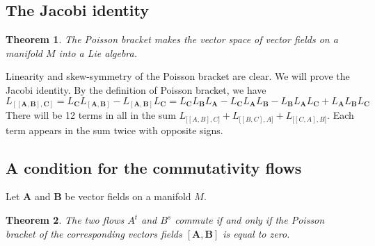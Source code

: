\documentclass{book}
\numberwithin{equation}{section}
\theoremstyle{plain}
\newtheorem*{thm*}{Theorem}
\let\oldendproof\endproof
\renewenvironment{proof}[1][\proofname]{%
  \oldproof[\textsc{#1}]%
}{\oldendproof}
\theoremstyle{definition}
\theoremstyle{remark}
\theoremstyle{smallcap}
\numberwithin{prob}{section}
\begin{document}
\subsection{The Jacobi identity}

\begin{thm*}
  The Poisson bracket  makes the vector space of vector fields on a manifold $M$
  into a Lie algebra.
\end{thm*}

\begin{proof}
  Linearity and skew-symmetry of the Poisson bracket are clear.
  We will prove the Jacobi identity. By the definition of Poisson bracket,
  we have
  $$
  L_\mathbf{ [[A, B], C]} =
  L_{\mathbf C} L_\mathbf{ [A, B] } -L_\mathbf{ [A, B]} L_{\mathbf C}
  =
   L_{\mathbf C} L_{\mathbf B} L_{\mathbf A}
  -L_{\mathbf C} L_{\mathbf A} L_{\mathbf B}
  -L_{\mathbf B} L_{\mathbf A} L_{\mathbf C}
  +L_{\mathbf A} L_{\mathbf B} L_{\mathbf C}
  $$
  There will be 12 terms in all in the sum
  $ L_{\mathbf [[A, B], C]} + L_{\mathbf [[B, C], A]} + L_{\mathbf [[C, A], B]}$.
  Each term appears in the sum twice with opposite signs.
\end{proof}

\subsection{A condition for the commutativity flows}

Let $\mathbf{A}$ and $\mathbf{B}$ be vector fields
on a manifold $M$.

\begin{thm*}
  The two flows $A^t$ and $B^s$ commute if and only if
  the Poisson bracket of the corresponding vectors fields
  $[\mathbf A, \mathbf B]$ is equal to zero.
\end{thm*}
\end{document}
